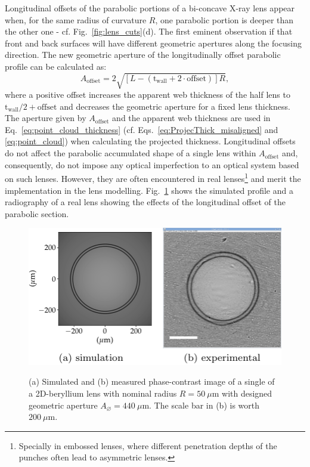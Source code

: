 \begin{refsection}
Longitudinal offsets of the parabolic portions of a bi-concave X-ray lens appear when, for the same radius of curvature $R$, one parabolic portion is deeper than the other one - cf. Fig.~\ref{fig:lens_cuts}(d). The first eminent observation if that front and back surfaces will have different geometric apertures along the focusing direction. The new geometric aperture of the longitudinally offset parabolic profile can be calculated as:
\begin{equation}\label{eq:A_2}
    A_{\text{offset}} = 2\sqrt{[L-(\text{t}_\text{wall}+2\cdot\text{offset})]R},
\end{equation}{}
where a positive offset increases the apparent web thickness of the half lens to $\text{t}_\text{wall}/2+\text{offset}$ and decreases the geometric aperture for a fixed lens thickness. The aperture given by $A_{\text{offset}}$ and the apparent web thickness are used in Eq.~\ref{eq:point_cloud_thickness} (cf. Eqs.~\ref{eq:ProjecThick_misaligned} and \ref{eq:point_cloud}) when calculating the projected thickness.
Longitudinal offsets do not affect the parabolic accumulated shape of a single lens within $A_{\text{offset}}$ and, consequently, do not impose any optical imperfection to an optical system based on such lenses. However, they are often encountered in real lenses\footnote{Specially in embossed lenses, where different penetration depths of the punches often lead to asymmetric lenses.} and merit the implementation in the lens modelling. Fig.~\ref{fig:longitudinal_offset} shows the simulated profile and a radiography of a real lens showing the effects of the longitudinal offset of the parabolic section.

\begin{figure}[t]
        \centering
        {\includegraphics[height=3.cm]{figures/ch04/longitudinal_offset.pdf}}
        \caption[Effects of the longitudinal offset of the parabolic section]{(a) Simulated and (b) measured phase-contrast image of a single of a 2D-beryllium lens with nominal radius $R=50~\mu\text{m}$ with designed geometric aperture $A_{\diameter}=440~\mu\text{m}$. The scale bar in (b) is worth $200~\mu$m.} \label{fig:longitudinal_offset}
\end{figure}


\end{refsection}

